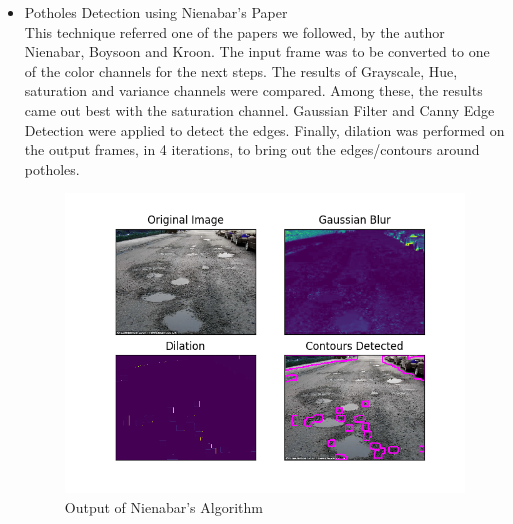 \documentclass[12pt,a4paper]{article}
\begin{document}
\begin{itemize}
\item Potholes Detection using Nienabar's Paper \\

This technique referred one of the papers we followed, by the author Nienabar, Boysoon and Kroon. The input frame was to be converted to one of the color channels for the next steps. The results of Grayscale, Hue, saturation and variance channels were compared. Among these, the results came out best with the saturation channel. Gaussian Filter and Canny Edge Detection were applied to detect the edges. Finally, dilation was performed on the output frames, in 4 iterations, to bring out the edges/contours around potholes.


    \begin{figure}[ht!]
        \centering
        \includegraphics[width = 5in]{images/nienabar_2.png}
        \caption{Output of Nienabar's Algorithm}
    \end{figure}
    

    

\end{itemize}
\end{document}

